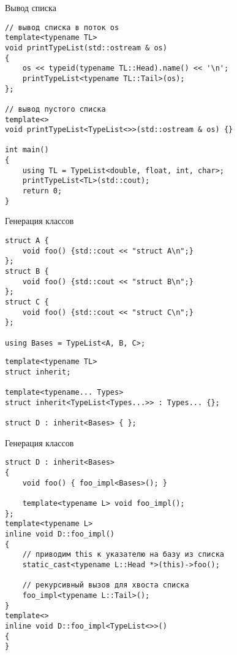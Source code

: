 \documentclass{beamer}
\begin{document}
\begin{frame}[fragile]{Вывод списка}
\begin{lstlisting}
// вывод списка в поток os
template<typename TL>
void printTypeList(std::ostream & os)
{
    os << typeid(typename TL::Head).name() << '\n';
    printTypeList<typename TL::Tail>(os);
};

// вывод пустого списка
template<>
void printTypeList<TypeList<>>(std::ostream & os) {}

int main()
{
    using TL = TypeList<double, float, int, char>;
    printTypeList<TL>(std::cout);
    return 0;
}
\end{lstlisting}
\end{frame}

\begin{frame}[fragile]{Генерация классов}
\begin{lstlisting}
struct A { 
    void foo() {std::cout << "struct A\n";} 
};
struct B { 
    void foo() {std::cout << "struct B\n";} 
};
struct C { 
    void foo() {std::cout << "struct C\n";} 
};

using Bases = TypeList<A, B, C>;
\end{lstlisting}
\pause\begin{lstlisting}
template<typename TL>
struct inherit;

template<typename... Types>
struct inherit<TypeList<Types...>> : Types... {};

struct D : inherit<Bases> { };
\end{lstlisting}
\end{frame}


\begin{frame}[fragile]{Генерация классов}
\begin{lstlisting}
struct D : inherit<Bases> 
{
    void foo() { foo_impl<Bases>(); } 

    template<typename L> void foo_impl();
};
template<typename L> 
inline void D::foo_impl()
{
    // приводим this к указателю на базу из списка
    static_cast<typename L::Head *>(this)->foo();
    
    // рекурсивный вызов для хвоста списка
    foo_impl<typename L::Tail>();
}
template<> 
inline void D::foo_impl<TypeList<>>() 
{
}
\end{lstlisting}
\end{frame}

\end{document}
